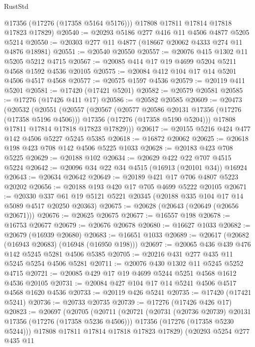 \begin{lexlean}{RustStd}
\begin{coremodule}
        @17356
        (@17276 (@17358 @5164 @5176)))
      @17808
      @17811
      @17814
      @17818
      @17823
      @17829)
@20540 := @20293 @5186 @277 @416 @11 @4506 @4877 @5205 @5214
@20550 := @20303 @277 @11 @4877 (@18667 @20062 @4333 @274 @11 @4876 @18981)
@20551 := @20540 @20550
@20557 := @20076 @415 @1302 @11 @5205 @5212 @4715
@20567 := @20085 @414 @17 @19 @4699 @5204 @5211 @4568 @1592 @4536 @20105
@20575 := @20084 @412 @104 @17 @14 @5201 @4506 @4517 @4568
@20577 := @20575 @1597 @4536
@20579 := @20119 @411 @5201
@20581 := @17420 (@17421 @5201)
@20582 := @20579 @20581
@20585 := @17276 (@17426 @411 @17)
@20586 := @20582 @20585
@20609 := @20473
    (@20532
      (@20551
        (@20557
          (@20567
            (@20577 @20586 @20131 @17356 (@17276 (@17358 @5196 @4506)))
            @17356
            (@17276 (@17358 @5190 @5204)))
          @17808
          @17811
          @17814
          @17818
          @17823
          @17829)))
@20617 := @20155 @5216 @424 @477 @142 @4506 @5227 @5245 @5385
@20618 := @16872 @20062
@20625 := @20618 @198 @423 @708 @142 @4506 @5225 @1033
@20628 := @20183 @423 @708 @5225
@20629 := @20188 @102
@20634 := @20629 @422 @22 @707 @4515 @5224
@20642 := @20096 @34 @22 @34 @4515 (@16913 (@20101 @34)) @16924
@20643 := @20634 @20642
@20649 := @20189 @421 @17 @706 @4807 @5223 @20202
@20656 := @20188 @193 @420 @17 @705 @4699 @5222 @20105
@20671 := @20330
    @337
    @61
    @19
    @5121
    @5221
    @20345
    (@20188 @335 @104 @17 @14 @5089 @4517 @20250 @20363)
@20675 := @20628 (@20643 (@20649 (@20656 @20671)))
@20676 := @20625 @20675
@20677 := @16557 @198
@20678 := @16753 @20677
@20679 := @20676 @20678
@20680 := @16627 @1033
@20682 := @20679 (@16939 @20680)
@20683 := @16651 @1033
@20689 := @20617 (@20682 (@16943 @20683) (@16948 (@16950 @198)))
@20697 := @20065 @436 @439 @476 @142 @5245 @5281 @4506 @5385
@20705 := @20216 @431 @277 @435 @11 @5245 @5254 @4506 @5281
@20711 := @20076 @430 @1302 @11 @5245 @5252 @4715
@20721 := @20085 @429 @17 @19 @4699 @5244 @5251 @4568 @1612 @4536 @20105
@20731 := @20084 @427 @104 @17 @14 @5241 @4506 @4517 @4568 @1620 @4536
@20733 := @20119 @426 @5241
@20735 := @17420 (@17421 @5241)
@20736 := @20733 @20735
@20739 := @17276 (@17426 @426 @17)
@20823 := @20697
    (@20705
      (@20711
        (@20721
          (@20731 (@20736 @20739) @20131 @17356 (@17276 (@17358 @5236 @4506)))
          @17356
          (@17276 (@17358 @5230 @5244)))
        @17808
        @17811
        @17814
        @17818
        @17823
        @17829)
      (@20293
        @5254
        @277
        @435
        @11

\end{coremodule}
\end{lexlean}
